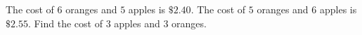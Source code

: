 The cost of $6$ oranges and $5$ apples is $\$2.40$. The cost of $5$ oranges and $6$ apples is $\$2.55$. Find the cost of $3$ apples and $3$ oranges.
